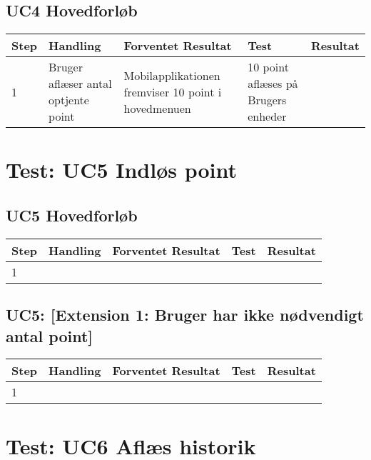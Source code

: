 \subsection{UC4 Hovedforløb}

\begin{longtable}{| p{0.7cm}  | p{3cm}  | p{4cm} |  p{3cm}  | p{3cm}  |}
\hline
Step & Handling & Forventet Resultat & Test & Resultat \\
\hline
1 & Bruger aflæser antal optjente point & Mobilapplikationen fremviser 10 point i hovedmenuen & 10 point aflæses på Brugers enheder &  \FuckingHuge{\checkmark} \\
\hline
\end{longtable}



\section{Test: UC5 Indløs point}

\subsection{UC5 Hovedforløb}

\begin{longtable}{| p{0.7cm}  | p{3cm}  | p{4cm} |  p{3cm}  | p{3cm}  |}
\hline
Step & Handling & Forventet Resultat & Test & Resultat \\
\hline
1 &   &  & & \FuckingHuge{\textdiv}  \\
\hline
\end{longtable}

\subsection{UC5: [Extension 1: Bruger har ikke nødvendigt antal point]}

\begin{longtable}{| p{0.7cm}  | p{3cm}  | p{4cm} |  p{3cm}  | p{3cm}  |}
\hline
Step & Handling & Forventet Resultat & Test & Resultat \\
\hline
1 &  &  & & \FuckingHuge{\textdiv} \\
\hline
\end{longtable}



\section{Test: UC6 Aflæs historik}

